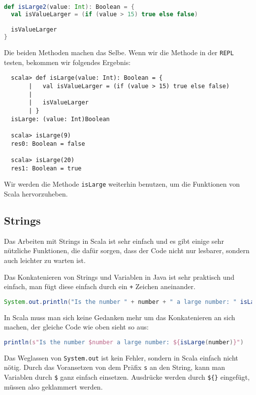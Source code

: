 \begin{lstlisting}[language=Scala]
def isLarge2(value: Int): Boolean = {
  val isValueLarger = (if (value > 15) true else false)

  isValueLarger
}
\end{lstlisting}

Die beiden Methoden machen das Selbe. Wenn wir die Methode in der \texttt{REPL} testen, bekommen wir folgendes Ergebnis:

\begin{verbatim}
  scala> def isLarge(value: Int): Boolean = {
       |   val isValueLarger = (if (value > 15) true else false)
       |
       |   isValueLarger
       | }
  isLarge: (value: Int)Boolean

  scala> isLarge(9)
  res0: Boolean = false

  scala> isLarge(20)
  res1: Boolean = true
\end{verbatim}

Wir werden die Methode \texttt{isLarge} weiterhin benutzen, um die Funktionen von Scala hervorzuheben.

\subsection{Strings}

Das Arbeiten mit Strings in Scala ist sehr einfach und es gibt einige sehr nützliche Funktionen, die dafür sorgen, dass der Code nicht nur lesbarer, sondern auch leichter zu warten ist.

Das Konkatenieren von Strings und Variablen in Java ist sehr praktisch und einfach, man fügt diese einfach durch ein \texttt{+} Zeichen aneinander.

\begin{lstlisting}[language=Java,numbers=none]
System.out.println("Is the number " + number + " a large number: " isLarge(number));
\end{lstlisting}

In Scala muss man sich keine Gedanken mehr um das Konkatenieren an sich machen, der gleiche Code wie oben sieht so aus:

\begin{lstlisting}[language=Scala,numbers=none]
println(s"Is the number $number a large number: ${isLarge(number)}")
\end{lstlisting}

Das Weglassen von \texttt{System.out} ist kein Fehler, sondern in Scala einfach nicht nötig. Durch das Voransetzen von dem Präfix \texttt{s} an den String, kann man Variablen durch \texttt{\$} ganz einfach einsetzen. Ausdrücke werden durch \texttt{\$\{\}} eingefügt, müssen also geklammert werden.

